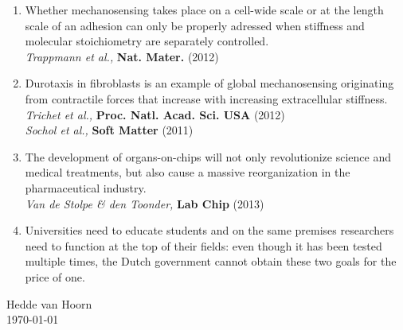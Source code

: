 \documentclass[11pt]{article}
\begin{document}
\begin{center}
\begin{enumerate}
\newpage
  \item Whether mechanosensing takes place on a cell-wide scale or at the length scale of an 
		adhesion can only be properly adressed when stiffness and molecular 
		stoichiometry are separately controlled. \\
  \hfill \emph{Trappmann et al.,} \textbf{Nat. Mater.} (2012)\\
  \item Durotaxis in fibroblasts is an example of global mechanosensing originating
		from contractile forces that increase with increasing extracellular stiffness. \\
  \hfill \emph{Trichet et al.,} \textbf{Proc. Natl. Acad. Sci. USA} (2012)\\
  \hfill \emph{Sochol et al.,} \textbf{Soft Matter} (2011)\\
  \item The development of organs-on-chips will not only revolutionize science and medical 
		treatments, but also cause a massive reorganization in the pharmaceutical industry. \\
  \hfill \emph{Van de Stolpe \& den Toonder,} \textbf{Lab Chip} (2013)\\
  \item Universities need to educate students and on the same premises researchers need to function 
		at the top of their fields: even though it has been tested multiple times, the Dutch government 
		cannot obtain these two goals for the price of one. \\
\end{enumerate}
\end{center}

\vfill
\flushright
  Hedde van Hoorn\\
  \today
\end{document}
